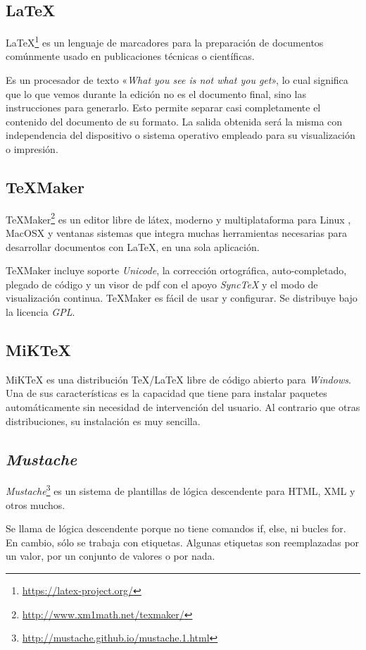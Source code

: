 \subsection{\LaTeX{}}
\LaTeX{}\footnote{\url{https://latex-project.org/}} es un lenguaje de marcadores para la preparación de documentos comúnmente usado en publicaciones técnicas o científicas.

Es un procesador de texto «\emph{What you see is not what you get}», lo cual significa que lo que vemos durante la edición no es el documento final, sino las instrucciones para generarlo.
Esto permite separar casi completamente el contenido del documento de su formato. La salida obtenida será la misma con independencia del dispositivo o sistema operativo empleado para su visualización o impresión.

\subsection{\TeX{}Maker}
\TeX{}Maker\footnote{\url{http://www.xm1math.net/texmaker/}} es un editor libre de látex, moderno y multiplataforma para Linux , MacOSX y ventanas sistemas que integra muchas herramientas necesarias para desarrollar documentos con \LaTeX{}, en una sola aplicación.

\TeX{}Maker incluye soporte \textit{Unicode}, la corrección ortográfica, auto-completado, plegado de código y un visor de pdf con el apoyo \textit{SyncTeX} y el modo de visualización continua. \TeX{}Maker es fácil de usar y configurar. Se distribuye bajo la licencia \textit{GPL}.

\subsection{MiK\TeX{}}
MiK\TeX{} es una distribución \TeX{}/\LaTeX{} libre de código abierto para \textit{Windows}.
Una de sus características es la capacidad que tiene para instalar paquetes automáticamente sin necesidad de intervención del usuario. Al contrario que otras distribuciones, su instalación es muy sencilla.

\subsection{\textit{Mustache}}
\textit{Mustache}\footnote{\url{http://mustache.github.io/mustache.1.html}} es un sistema de plantillas de lógica descendente para HTML, XML y otros muchos.

Se llama de lógica descendente porque no tiene comandos if, else, ni bucles for. En cambio, sólo se trabaja con etiquetas.
Algunas etiquetas son reemplazadas por un valor, por un conjunto de valores o por nada.

